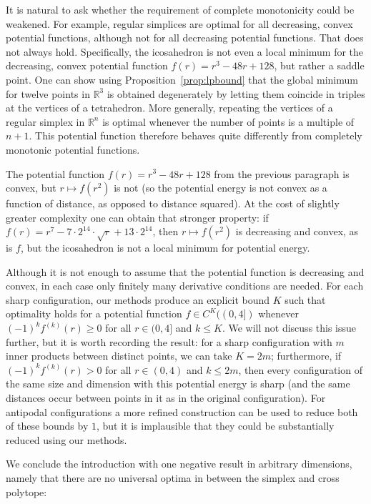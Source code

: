 \documentclass{jams-l}
\theoremstyle{plain}
\numberwithin{theorem}{section}
\theoremstyle{definition}
\numberwithin{equation}{section}
\newcommand{\R}{{\mathbb R}}
\begin{document}
It is natural to ask whether the requirement of complete
monotonicity could be weakened.  For example, regular simplices
are optimal for all decreasing, convex potential functions,
although not for all decreasing potential functions. That does not
always hold. Specifically, the icosahedron is not even a local
minimum for the decreasing, convex potential function $f(r) =
r^3-48r+128$, but rather a saddle point.  One can show using
Proposition~\ref{prop:lpbound} that the global minimum for twelve
points in $\R^3$ is obtained degenerately by letting them coincide
in triples at the vertices of a tetrahedron.  More generally,
repeating the vertices of a regular simplex in $\R^n$ is optimal
whenever the number of points is a multiple of $n+1$.  This
potential function therefore behaves quite differently from
completely monotonic potential functions.

The potential function $f(r) = r^3-48r+128$ from the previous
paragraph is convex, but $r \mapsto f(r^2)$ is not (so the
potential energy is not convex as a function of distance, as
opposed to distance squared). At the cost of slightly greater
complexity one can obtain that stronger property: if $f(r) = r^7 -
7\cdot2^{14}\cdot \sqrt{r} + 13\cdot2^{14}$, then $r \mapsto
f(r^2)$ is decreasing and convex, as is $f$, but the icosahedron
is not a local minimum for potential energy.

Although it is not enough to assume that the potential function is
decreasing and convex, in each case only finitely many derivative
conditions are needed.  For each sharp configuration, our methods
produce an explicit bound $K$ such that optimality holds for a
potential function $f \in C^K((0,4])$ whenever $(-1)^kf^{(k)}(r)
\ge 0$ for all $r \in (0,4]$ and $k \le K$. We will not discuss
this issue further, but it is worth recording the result: for a
sharp configuration with $m$ inner products between distinct
points, we can take $K = 2m$; furthermore, if $(-1)^k f^{(k)}(r)
> 0$ for all $r \in (0,4)$ and $k \le 2m$, then every
configuration of the same size and dimension with this potential
energy is sharp (and the same distances occur between points in it
as in the original configuration). For antipodal configurations a
more refined construction can be used to reduce both of these
bounds by $1$, but it is implausible that they could be
substantially reduced using our methods.

We conclude the introduction with one negative result in arbitrary
dimensions, namely that there are no universal optima in between
the simplex and cross polytope:
\end{document}
